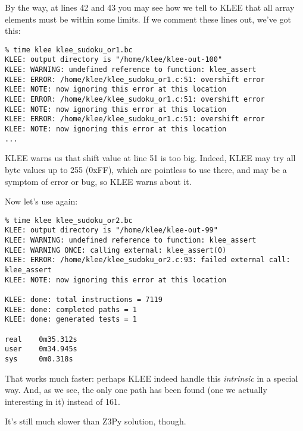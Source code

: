 By the way, at lines 42 and 43 you may see how we tell to KLEE that all array elements must be within some limits.
If we comment these lines out, we've got this:

\begin{lstlisting}
% time klee klee_sudoku_or1.bc
KLEE: output directory is "/home/klee/klee-out-100"
KLEE: WARNING: undefined reference to function: klee_assert
KLEE: ERROR: /home/klee/klee_sudoku_or1.c:51: overshift error
KLEE: NOTE: now ignoring this error at this location
KLEE: ERROR: /home/klee/klee_sudoku_or1.c:51: overshift error
KLEE: NOTE: now ignoring this error at this location
KLEE: ERROR: /home/klee/klee_sudoku_or1.c:51: overshift error
KLEE: NOTE: now ignoring this error at this location
...
\end{lstlisting}

KLEE warns us that shift value at line 51 is too big.
Indeed, KLEE may try all byte values up to 255 (0xFF), which are pointless to use there,
and may be a symptom of error or bug, so KLEE warns about it. %

Now let's use  again:



\begin{lstlisting}
% time klee klee_sudoku_or2.bc
KLEE: output directory is "/home/klee/klee-out-99"
KLEE: WARNING: undefined reference to function: klee_assert
KLEE: WARNING ONCE: calling external: klee_assert(0)
KLEE: ERROR: /home/klee/klee_sudoku_or2.c:93: failed external call: klee_assert
KLEE: NOTE: now ignoring this error at this location

KLEE: done: total instructions = 7119
KLEE: done: completed paths = 1
KLEE: done: generated tests = 1

real    0m35.312s
user    0m34.945s
sys     0m0.318s
\end{lstlisting}

That works much faster: perhaps KLEE indeed handle this \textit{intrinsic} in a special way.
And, as we see, the only one path has been found (one we actually interesting in it) instead of 161.

It's still much slower than Z3Py solution, though.


